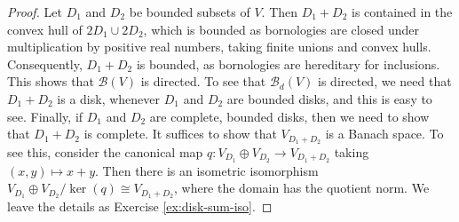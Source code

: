 \begin{proof}
    Let \(D_1\) and \(D_2\) be bounded subsets of \(V\). Then \(D_1 + D_2\) is contained in the convex hull of \(2D_1 \cup 2D_2\), which is bounded as bornologies are closed under multiplication by positive real numbers, taking finite unions and convex hulls. Consequently, \(D_1 + D_2\) is bounded, as bornologies are hereditary for inclusions. This shows that \(\mathcal{B}(V)\) is directed. To see that \(\mathcal{B}_d(V)\) is directed, we need that \(D_1 + D_2\) is a disk, whenever \(D_1\) and \(D_2\) are bounded disks, and this is easy to see. Finally, if \(D_1\) and \(D_2\) are complete, bounded disks, then we need to show that \(D_1 + D_2\) is complete. It suffices to show that \(V_{D_1 + D_2}\) is a Banach space. To see this, consider the canonical map \(q \colon V_{D_1} \oplus V_{D_2} \to V_{D_1 + D_2}\) taking \((x,y) \mapsto x + y\). Then there is an isometric isomorphism \(V_{D_1} \oplus V_{D_2}/\ker(q) \cong V_{D_1 + D_2}\), where the domain has the quotient norm. We leave the 
    details as Exercise \ref{ex:disk-sum-iso}.
\end{proof}